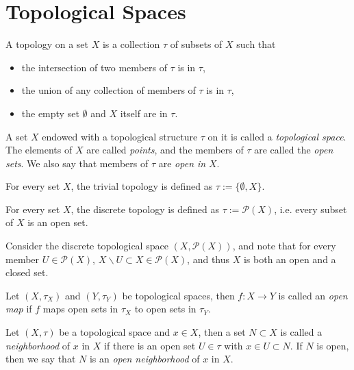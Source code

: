 \section{Topological Spaces}
\begin{defn}
	A topology on a set $X$ is a collection $\tau$ of subsets of $X$ such that 
	\begin{itemize}
		\item the intersection of two members of $\tau$ is in $\tau$, 
		\item the union of any collection of members of $\tau$ is in $\tau$, 
		\item the empty set $\emptyset$ and $X$ itself are in $\tau$.
	\end{itemize}
	A set $X$ endowed with a topological structure $\tau$ on it is called a \textit{topological space}. The elements of $X$ are called \textit{points}, and the members of $\tau$ are called the \textit{open sets}. We also say that members of $\tau$ are \textit{open in} $X$.
\end{defn} 

\begin{exmp}
	For every set $X$, the trivial topology is defined as $\tau := \{\emptyset, X\}$.
\end{exmp}

\begin{exmp}\label{exmp:discrete_topology}
	For every set $X$, the discrete topology is defined as $\tau := \mathcal P(X)$, i.e. every subset of $X$ is an open set.
\end{exmp}

\begin{remark}
	Consider the discrete topological space $(X, \mathscr P(X))$, and note that for every member $U\in \mathscr P(X)$, $X\backslash U\subset X\in \mathscr P(X)$, and thus $X$ is both an open and a closed set. 
\end{remark}

\begin{defn}\label{defn:open_map}
	Let $(X, \tau_X)$ and $(Y, \tau_Y)$ be topological spaces, then $f: X \to Y$ is called an \textit{open map} if $f$ maps open sets in $\tau_X$ to open sets in $\tau_Y$.
\end{defn}

\begin{defn}
	Let $(X, \tau)$ be a topological space and $x\in X$, then a set $N\subset X$ is called a \textit{neighborhood} of $x$ in $X$ if there is an open set $U\in\tau$ with $x\in U\subset N$. If $N$ is open, then we say that $N$ is an \textit{open neighborhood} of $x$ in $X$. 
\end{defn}

